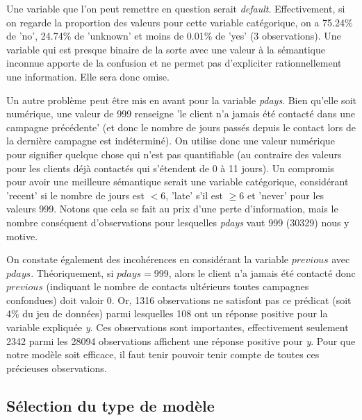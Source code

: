 \documentclass[]{article}
\begin{document}
Une variable que l'on peut remettre en question serait \textit{default}. Effectivement, si on regarde la proportion des valeurs pour cette variable catégorique, on a 75.24\% de 'no', 24.74\% de 'unknown' et moins de 0.01\% de 'yes' (3 observations). Une variable qui est presque binaire de la sorte avec une valeur à la sémantique inconnue apporte de la confusion et ne permet pas d'expliciter rationnellement une information. Elle sera donc omise.\\

\par Un autre problème peut être mis en avant pour la variable \textit{pdays}. Bien qu'elle soit numérique, une valeur de 999 renseigne 'le client n'a jamais été contacté dans une campagne précédente' (et donc le nombre de jours passés depuis le contact lors de la dernière campagne est indéterminé). On utilise donc une valeur numérique pour signifier quelque chose qui n'est pas quantifiable (au contraire des valeurs pour les clients déjà contactés qui s'étendent de 0 à 11 jours). Un compromis pour avoir une meilleure sémantique serait une variable catégorique, considérant 'recent' si le nombre de jours est $<6$, 'late' s'il est $\geq 6$ et 'never' pour les valeurs 999. Notons que cela se fait au prix d'une perte d'information, mais le nombre conséquent d'observations pour lesquelles \textit{pdays} vaut 999 (30329) nous y motive.\\

\par On constate également des incohérences en considérant la variable $previous$ avec $pdays$. Théoriquement, si $pdays=999$, alors le client n'a jamais été contacté donc $previous$ (indiquant le nombre de contacts ultérieurs toutes campagnes confondues) doit valoir 0. Or, 1316 observations ne satisfont pas ce prédicat (soit 4\% du jeu de données) parmi lesquelles 108 ont un réponse positive pour la variable expliquée \textit{y}. Ces observations sont importantes, effectivement seulement 2342 parmi les 28094 observations affichent une réponse positive pour \textit{y}. Pour que notre modèle soit efficace, il faut tenir pouvoir tenir compte de toutes ces précieuses observations.


\subsection{Sélection du type de modèle}
\end{document}
